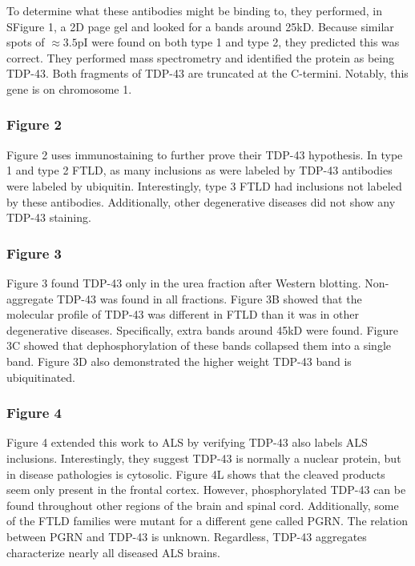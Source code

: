 To determine what these antibodies might be binding to, they performed, in SFigure 1, a 2D page gel and looked for a bands around 25kD. Because similar spots of $\approx 3.5$pI were found on both type 1 and type 2, they predicted this was correct. They performed mass spectrometry and identified the protein as being TDP-43. Both fragments of TDP-43 are truncated at the C-termini. Notably, this gene is on chromosome 1. 

\subsubsection*{Figure 2}

Figure 2 uses immunostaining to further prove their TDP-43 hypothesis. In type 1 and type 2 FTLD, as many inclusions as were labeled by TDP-43 antibodies were labeled by ubiquitin. Interestingly, type 3 FTLD had inclusions not labeled by these antibodies. Additionally, other degenerative diseases did not show any TDP-43 staining. 

\subsubsection*{Figure 3} 

Figure 3 found TDP-43 only in the urea fraction after Western blotting. Non-aggregate TDP-43 was found in all fractions. Figure 3B showed that the molecular profile of TDP-43 was different in FTLD than it was in other degenerative diseases. Specifically, extra bands around 45kD were found. Figure 3C showed that dephosphorylation of these bands collapsed them into a single band. Figure 3D also demonstrated the higher weight TDP-43 band is ubiquitinated. 

\subsubsection*{Figure 4}

Figure 4 extended this work to ALS by verifying TDP-43 also labels ALS inclusions. Interestingly, they suggest TDP-43 is normally a nuclear protein, but in disease pathologies is cytosolic. Figure 4L shows that the cleaved products seem only present in the frontal cortex. However, phosphorylated TDP-43 can be found throughout other regions of the brain and spinal cord. Additionally, some of the FTLD families were mutant for a different gene called PGRN. The relation between PGRN and TDP-43 is unknown. Regardless, TDP-43 aggregates characterize nearly all diseased ALS brains. 


